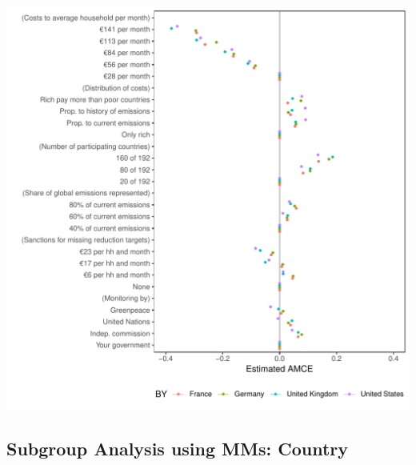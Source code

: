 \documentclass[a4paper,12pt]{article}\usepackage[]{graphicx}\usepackage[]{color}
\makeatletter
\def\maxwidth{ %
  \ifdim\Gin@nat@width>\linewidth
    \linewidth
  \else
    \Gin@nat@width
  \fi
}
\newenvironment{knitrout}{}{} %
\makeatother
\begin{document}
\begin{knitrout}
\color{fgcolor}
\includegraphics[width=\maxwidth]{figure/bechtel_subgroup_amce-1} 

\end{knitrout}




\clearpage

\subsection{Subgroup Analysis using MMs: Country}
\end{document}
